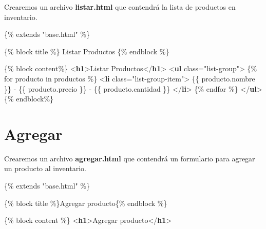 \documentclass[
  a4paper,
  DIV=11,
  numbers=noendperiod,
  onepage,
  openany]{scrreprt}
\newenvironment{Shaded}{\begin{snugshade}}{\end{snugshade}}
\newcommand{\DataTypeTok}[1]{\textcolor[rgb]{0.68,0.00,0.00}{#1}}
\newcommand{\KeywordTok}[1]{\textcolor[rgb]{0.00,0.23,0.31}{\textbf{#1}}}
\newcommand{\NormalTok}[1]{\textcolor[rgb]{0.00,0.23,0.31}{#1}}
\newcommand{\OperatorTok}[1]{\textcolor[rgb]{0.37,0.37,0.37}{#1}}
\newcommand{\OtherTok}[1]{\textcolor[rgb]{0.00,0.23,0.31}{#1}}
\newcommand{\StringTok}[1]{\textcolor[rgb]{0.13,0.47,0.30}{#1}}
\begin{document}
\begin{tcolorbox}
Crearemos un archivo \textbf{listar.html} que contendrá la lista de
productos en inventario.

\begin{Shaded}
\begin{Highlighting}[]
\NormalTok{\{\% extends "base.html" \%\}}

\NormalTok{\{\% block title \%\} Listar Productos \{\% endblock \%\}}

\NormalTok{\{\% block content\%\}}
\DataTypeTok{\textless{}}\KeywordTok{h1}\DataTypeTok{\textgreater{}}\NormalTok{Listar Productos}\DataTypeTok{\textless{}/}\KeywordTok{h1}\DataTypeTok{\textgreater{}}
\DataTypeTok{\textless{}}\KeywordTok{ul}\OtherTok{ class}\OperatorTok{=}\StringTok{"list{-}group"}\DataTypeTok{\textgreater{}}
\NormalTok{    \{\% for producto in productos \%\}}
    \DataTypeTok{\textless{}}\KeywordTok{li}\OtherTok{ class}\OperatorTok{=}\StringTok{"list{-}group{-}item"}\DataTypeTok{\textgreater{}} 
\NormalTok{        \{\{ producto.nombre \}\} {-} \{\{ producto.precio \}\} {-} \{\{ producto.cantidad \}\}}
    \DataTypeTok{\textless{}/}\KeywordTok{li}\DataTypeTok{\textgreater{}}
\NormalTok{    \{\% endfor \%\}}
\DataTypeTok{\textless{}/}\KeywordTok{ul}\DataTypeTok{\textgreater{}}
\NormalTok{\{\% endblock\%\}}
\end{Highlighting}
\end{Shaded}

\section{Agregar}\label{agregar}

Crearemos un archivo \textbf{agregar.html} que contendrá un formulario
para agregar un producto al inventario.

\begin{Shaded}
\begin{Highlighting}[]
\NormalTok{\{\% extends "base.html" \%\}}

\NormalTok{\{\% block title \%\}Agregar producto\{\% endblock \%\}}

\NormalTok{\{\% block content \%\}}
\DataTypeTok{\textless{}}\KeywordTok{h1}\DataTypeTok{\textgreater{}}\NormalTok{Agregar producto}\DataTypeTok{\textless{}/}\KeywordTok{h1}\DataTypeTok{\textgreater{}}


\end{Highlighting}
\end{Shaded}
\end{tcolorbox}
\end{document}
